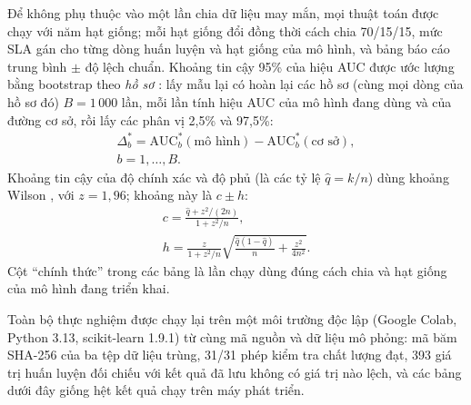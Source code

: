 \documentclass[journal]{IEEEtran}
\begin{document}
Để không phụ thuộc vào một lần chia dữ liệu may mắn, mọi thuật toán được chạy với năm hạt giống; mỗi hạt giống đổi đồng thời cách chia 70/15/15, mức SLA gán cho từng dòng huấn luyện và hạt giống của mô hình, và bảng báo cáo trung bình $\pm$ độ lệch chuẩn. Khoảng tin cậy 95\% của hiệu AUC được ước lượng bằng bootstrap theo \emph{hồ sơ} \cite{efron1979}: lấy mẫu lại có hoàn lại các hồ sơ (cùng mọi dòng của hồ sơ đó) $B=1\,000$ lần, mỗi lần tính hiệu AUC của mô hình đang dùng và của đường cơ sở, rồi lấy các phân vị 2,5\% và 97,5\%:
\begin{equation}
\begin{gathered}
\Delta_b^{*}=\mathrm{AUC}_b^{*}(\text{mô hình})-\mathrm{AUC}_b^{*}(\text{cơ sở}),\\
b=1,\dots,B.
\end{gathered}
\end{equation}
Khoảng tin cậy của độ chính xác và độ phủ (là các tỷ lệ $\hat{q}=k/n$) dùng khoảng Wilson \cite{wilson1927}, với $z=1{,}96$; khoảng này là $c\pm h$:
\begin{equation}
\begin{gathered}
c=\frac{\hat{q}+z^2/(2n)}{1+z^2/n},\\[4pt]
h=\frac{z}{1+z^2/n}\sqrt{\frac{\hat{q}(1-\hat{q})}{n}+\frac{z^2}{4n^2}}.
\end{gathered}
\end{equation}
Cột ``chính thức'' trong các bảng là lần chạy dùng đúng cách chia và hạt giống của mô hình đang triển khai.

Toàn bộ thực nghiệm được chạy lại trên một môi trường độc lập (Google Colab, Python 3.13, scikit-learn 1.9.1) từ cùng mã nguồn và dữ liệu mô phỏng: mã băm SHA-256 của ba tệp dữ liệu trùng, 31/31 phép kiểm tra chất lượng đạt, 393 giá trị huấn luyện đối chiếu với kết quả đã lưu không có giá trị nào lệch, và các bảng dưới đây giống hệt kết quả chạy trên máy phát triển.
\end{document}

